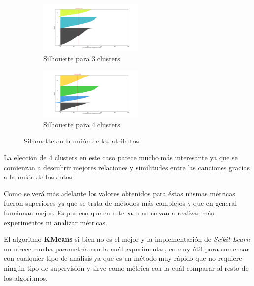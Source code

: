 \begin{figure}[H]
    \begin{subfigure}{.4\textwidth}
        \centering
        \includegraphics[width = 2in]{img/kmeans/silhouette-join-3-eo.png}
        \caption{Silhouette para 3 clusters}
    \end{subfigure}
    \begin{subfigure}{.4\textwidth}
        \centering
        \includegraphics[width = 2in]{img/kmeans/silhouette-join-4-eo.png}
        \caption{Silhouette para 4 clusters}
    \end{subfigure}
    \caption{Silhouette en la unión de los atributos}
    \label{fig:silhouette-join-3-4}
\end{figure}

La elección de 4 clusters en este caso parece mucho más interesante ya que se comienzan a descubrir mejores relaciones y similitudes entre las canciones gracias a la unión de los datos.

Como se verá más adelante los valores obtenidos para éstas mismas métricas fueron superiores ya que se trata de métodos más complejos y que en general funcionan mejor. Es por eso que en este caso no se van a realizar más experimentos ni analizar métricas.

El algoritmo \textbf{KMeans} si bien no es el mejor y la implementación de \textit{Scikit Learn} no ofrece mucha parametría con la cuál experimentar, es muy útil para comenzar con cualquier tipo de análisis ya que es un método muy rápido que no requiere ningún tipo de supervisión y sirve como métrica con la cuál comparar al resto de los algoritmos.

